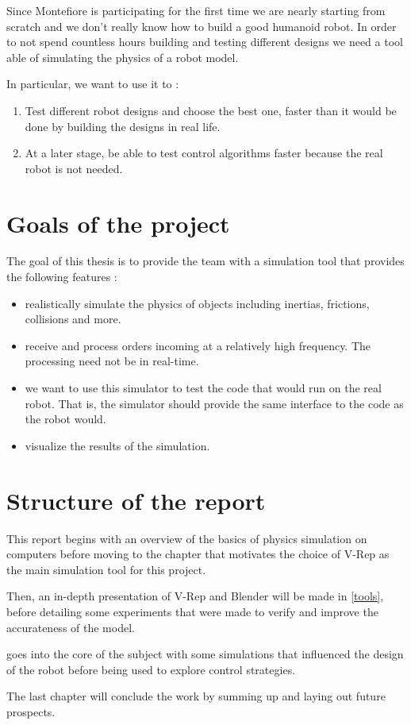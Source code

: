 Since Montefiore is participating for the first time we are nearly starting from scratch and we don't really know how to build a good humanoid robot. In order to not spend countless hours building and testing different designs we need a tool able of simulating the physics
of a robot model. 

In particular, we want to use it to :
\begin{enumerate}
\item Test different robot designs and choose the best one, faster than it would be done by building the designs in real life.
\item At a later stage, be able to test control algorithms faster because the real robot is not needed.
\end{enumerate}

\section{Goals of the project}
The goal of this thesis is to provide the team with a simulation tool that provides the following features :
\begin{itemize}
\item realistically simulate the physics of objects including inertias, frictions, collisions and more.
\item receive and process orders incoming at a relatively high frequency. The processing need not be in real-time.
\item we want to use this simulator to test the code that would run on the real robot. That is, the simulator should provide the same interface to the code as the robot would.
\item visualize the results of the simulation.
\end{itemize}

\section{Structure of the report}
This report begins with an overview of the basics of physics simulation on computers before moving to the chapter that motivates the choice of V-Rep as the main simulation tool for this project.

Then, an in-depth presentation of V-Rep and Blender will be made in \cref{tools}, before detailing some experiments that were made to verify and improve the accurateness of the model.

 goes into the core of the subject with some simulations that influenced the design of the robot before being used to explore control strategies.

The last chapter will conclude the work by summing up and laying out future prospects.
